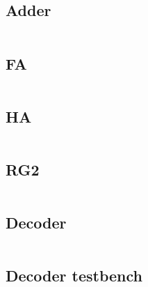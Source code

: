 \documentclass[10pt,a4paper,twocolumn]{article}
\begin{document}
\subsection{Adder}
\label{sec:Adder_VHDL}
\begin{minipage}{\linewidth}
  \footnotesize
  \inputminted{vhdl}{vhdl/Adder.vhd}
  \label{vhdl:Adder}
\end{minipage}

\subsection{FA}
\label{sec:FA_VHDL}
\begin{minipage}{\linewidth}
\footnotesize
\inputminted{vhdl}{vhdl/FA.vhd}
\label{vhdl:FA}
\end{minipage}

\subsection{HA}
\label{sec:HA_VHDL}
\begin{minipage}{\linewidth}
\footnotesize
\inputminted{vhdl}{vhdl/HA.vhd}
\label{vhdl:HA}
\end{minipage}

\subsection{RG2}
\label{sec:RG2_VHDL}
\begin{minipage}{\linewidth}
  \footnotesize
  \inputminted{vhdl}{vhdl/RG2.vhd}
  \label{vhdl:RG2}
\end{minipage}

\subsection{Decoder}
\label{sec:Decoder_VHDL}
\begin{minipage}{\linewidth}
\footnotesize
\inputminted{vhdl}{vhdl/Decoder.vhd}
\label{vhdl:Decoder}
\end{minipage}

\subsection{Decoder testbench}
\label{sec:Decoder_tb_VHDL}
\begin{minipage}{\linewidth}
\footnotesize
\inputminted{vhdl}{vhdl/Decoder_tb.vhd}
\label{vhdl:Decoder_tb}
\end{minipage}
\end{document}

